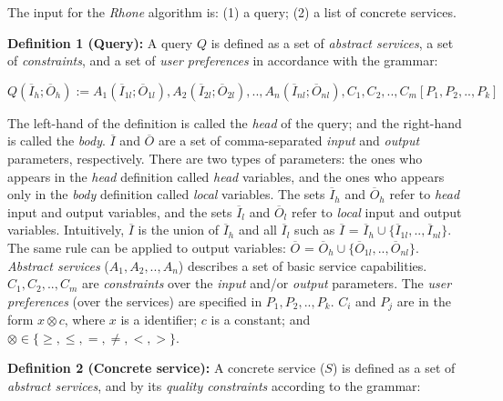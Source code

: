 The input for the \textit{Rhone} algorithm is: (1) a query; (2) a list of concrete services.

\noindent \textbf{Definition 1 (Query):}
A query $Q$ is defined as a set of \textit{abstract services}, a set of \textit{constraints}, and a set of \textit{user preferences} in accordance with the grammar: 

\begin{center}

\begin{math}
Q (\overline{I}_{h}; \overline{O}_{h}) := A_{1}(\overline{I}_{1l}; \overline{O}_{1l}), A_{2}(\overline{I}_{2l}; \overline{O}_{2l}), ..,  A_{n}(\overline{I}_{nl}; \overline{O}_{nl}),C_{1},C_{2}, .., C_{m}[P_{1},P_{2}, .., P_{k}]
\end{math}

\end{center}

The left-hand of the definition is called the \textit{head} of the query; and the right-hand is called the \textit{body}. 
%
$\overline{I}$ and $\overline{O}$ are a set of comma-separated \textit{input} and \textit{output} parameters, respectively.
%
There are two types of parameters: the ones who appears in the \textit{head} definition called \textit{head} variables, and the ones who appears only in the \textit{body} definition called \textit{local} variables.
%
The sets $\overline{I}_{h}$ and $\overline{O}_{h}$ refer to \textit{head} input and output variables, 
and the sets $\overline{I}_{l}$ and $\overline{O}_{l}$ refer to \textit{local} input and output variables.
Intuitively, $\overline{I}$ is the union of $\overline{I}_{h}$ and all $\overline{I}_{l}$ such as  
$\overline{I}$ =  $\overline{I}_{h} \cup \lbrace\overline{I}_{1l},..,\overline{I}_{nl}\rbrace$. 
The same rule can be applied to output variables: $\overline{O}$ =  $\overline{O}_{h} \cup \lbrace\overline{O}_{1l},..,\overline{O}_{nl}\rbrace$.
% 
\textit{Abstract services} ($A_{1}, A_{2}, .., A_{n}$) describes a set of basic service capabilities.
%
$C_{1}, C_{2}, .., C_{m}$ are \textit{constraints} over the \textit{input} and/or \textit{output} parameters.
The \textit{user preferences} (over the services) are specified in $P_{1}, P_{2}, .., P_{k}$. 
%
$C_{i}$ and $P_{j}$ are in the form $x \otimes c$, where $x$ is a identifier; $c$ is a constant; and
$\otimes \in\lbrace \geq, \leq, =, \neq, <, >\rbrace$.

\noindent \textbf{Definition 2 (Concrete service):} A concrete service ($S$) is defined as a set of 
\textit{abstract services}, and by its \textit{quality constraints} according to the grammar:

